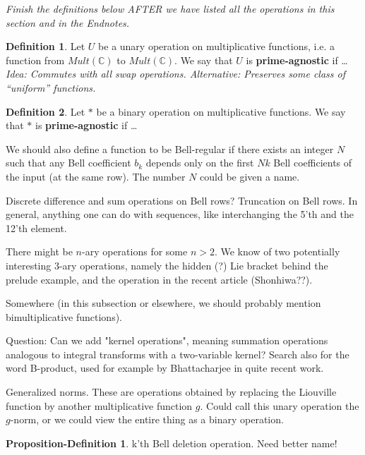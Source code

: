 \documentclass[a4paper]{article}
\theoremstyle{definition}
\newtheorem{definition}{Definition}[section]
\newtheorem{propdef}[theorem]{Proposition-Definition}
\theoremstyle{remark}
\newcommand{\defhl}[1]{\textbf{#1}}
\begin{document}
\emph{Finish the definitions below AFTER we have listed all the operations in this section and in the Endnotes.}

\begin{definition}
Let $U$ be a unary operation on multiplicative functions, i.e. a function from $Mult(\mathbb{C})$ to $Mult(\mathbb{C})$. We say that $U$ is \defhl{prime-agnostic} if \ldots \emph{Idea: Commutes with all swap operations. Alternative: Preserves some class of ``uniform'' functions.}
\end{definition}

\begin{definition}
Let $*$ be a binary operation on multiplicative functions. We say that $*$ is \defhl{prime-agnostic} if \ldots 
\end{definition}

We should also define a function to be Bell-regular if there exists an integer $N$ such that any Bell coefficient $b_k$ depends only on the first $Nk$ Bell coefficients of the input (at the same row). The number $N$ could be given a name.


Discrete difference and sum operations on Bell rows? Truncation on Bell rows. In general, anything one can do with sequences, like interchanging the 5'th and the 12'th element.

There might be $n$-ary operations for some $n>2$. We know of two potentially interesting 3-ary operations, namely the hidden (?) Lie bracket behind the prelude example, and the operation in the recent article (Shonhiwa??).  


Somewhere (in this subsection or elsewhere, we should probably mention bimultiplicative functions). 

Question: Can we add "kernel operations", meaning summation operations analogous to integral transforms with a two-variable kernel? Search also for the word B-product, used for example by Bhattacharjee in quite recent work.

Generalized norms. These are operations obtained by replacing the Liouville function by another multiplicative function $g$. Could call this unary operation the $g$-norm, or we could view the entire thing as a binary operation.

\begin{propdef}
k'th Bell deletion operation. Need better name!
\end{propdef}
\end{document}
